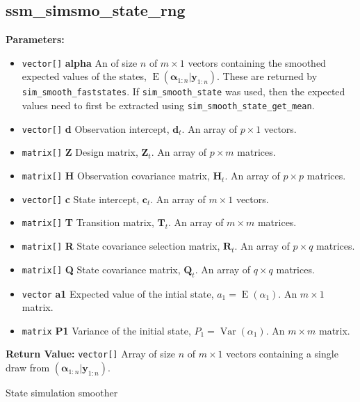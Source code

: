 \documentclass[]{book}
\providecommand{\tightlist}{%
  \setlength{\itemsep}{0pt}\setlength{\parskip}{0pt}}
\DeclareMathOperator{\E}{E}
\DeclareMathOperator{\Var}{Var}
\newcommand{\mat}[1]{\boldsymbol{#1}}
\renewcommand{\vec}[1]{\boldsymbol{#1}}
\begin{document}
\subsection{ssm\_simsmo\_state\_rng}\label{ssmux5fsimsmoux5fstateux5frng}

\textbf{Parameters:}

\begin{itemize}
\tightlist
\item
  \texttt{vector{[}{]}} \textbf{alpha} An of size \(n\) of
  \(m \times 1\) vectors containing the smoothed expected values of the
  states, \(\E(\vec{\alpha}_{1:n} | \vec{y}_{1:n})\). These are returned
  by \texttt{sim\_smooth\_faststates}. If \texttt{sim\_smooth\_state}
  was used, then the expected values need to first be extracted using
  \texttt{sim\_smooth\_state\_get\_mean}.
\item
  \texttt{vector{[}{]}} \textbf{d} Observation intercept, \(\vec{d}_t\).
  An array of \(p \times 1\) vectors.
\item
  \texttt{matrix{[}{]}} \textbf{Z} Design matrix, \(\mat{Z}_t\). An
  array of \(p \times m\) matrices.
\item
  \texttt{matrix{[}{]}} \textbf{H} Observation covariance matrix,
  \(\mat{H}_t\). An array of \(p \times p\) matrices.
\item
  \texttt{vector{[}{]}} \textbf{c} State intercept, \(\vec{c}_t\). An
  array of \(m \times 1\) vectors.
\item
  \texttt{matrix{[}{]}} \textbf{T} Transition matrix, \(\mat{T}_t\). An
  array of \(m \times m\) matrices.
\item
  \texttt{matrix{[}{]}} \textbf{R} State covariance selection matrix,
  \(\mat{R} _t\). An array of \(p \times q\) matrices.
\item
  \texttt{matrix{[}{]}} \textbf{Q} State covariance matrix,
  \(\mat{Q}_t\). An array of \(q \times q\) matrices.
\item
  \texttt{vector} \textbf{a1} Expected value of the intial state,
  \(a_1 = \E(\alpha_1)\). An \(m \times 1\) matrix.
\item
  \texttt{matrix} \textbf{P1} Variance of the initial state,
  \(P_1 = \Var(\alpha_1)\). An \(m \times m\) matrix.
\end{itemize}

\textbf{Return Value:} \texttt{vector{[}{]}} Array of size \(n\) of
\(m \times 1\) vectors containing a single draw from
\((\vec{\alpha}_{1:n} | \vec{y}_{1:n})\).

State simulation smoother
\end{document}

